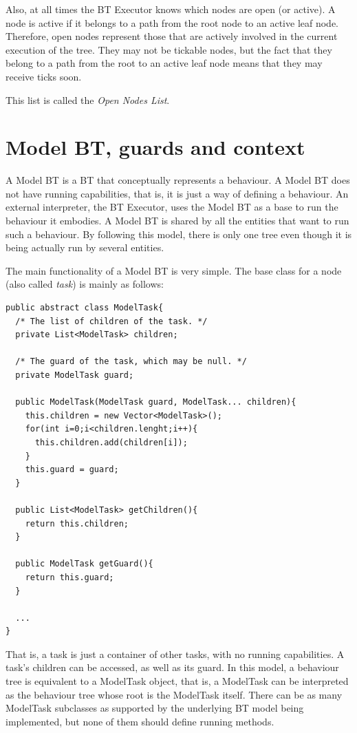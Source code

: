 \documentclass[a4paper,10pt]{article}
\begin{document}
Also, at all times the BT Executor knows which nodes are open (or active). A node is active if it belongs to a path from the root node to an active leaf node. Therefore, open nodes represent those that are actively involved in the current execution of the tree. They may not be tickable nodes, but the fact that they belong to a path from the root to an active leaf node means that they may receive ticks soon.

This list is called the \textit{Open Nodes List}.

\section{Model BT, guards and context}

A Model BT is a BT that conceptually represents a behaviour. A Model BT does not have running capabilities, that is, it is just a way of defining a behaviour. An external interpreter, the BT Executor, uses the Model BT as a base to run the behaviour it embodies. A Model BT is shared by all the entities that want to run such a behaviour. By following this model, there is only one tree even though it is being actually run by several entities.

The main functionality of a Model BT is very simple. The base class for a node (also called \textit{task}) is mainly as follows:

\begin{verbatim}
public abstract class ModelTask{
  /* The list of children of the task. */
  private List<ModelTask> children;

  /* The guard of the task, which may be null. */
  private ModelTask guard;

  public ModelTask(ModelTask guard, ModelTask... children){
    this.children = new Vector<ModelTask>();
    for(int i=0;i<children.lenght;i++){
      this.children.add(children[i]);
    }
    this.guard = guard;
  }

  public List<ModelTask> getChildren(){
    return this.children;
  }

  public ModelTask getGuard(){
    return this.guard;
  }

  ...
}
\end{verbatim}

That is, a task is just a container of other tasks, with no running capabilities. A task's children can be accessed, as well as its guard. In this model, a behaviour tree is equivalent to a ModelTask object, that is, a ModelTask can be interpreted as the behaviour tree whose root is the ModelTask itself. There can be as many ModelTask subclasses as supported by the underlying BT model being implemented, but none of them should define running methods.
\end{document}
